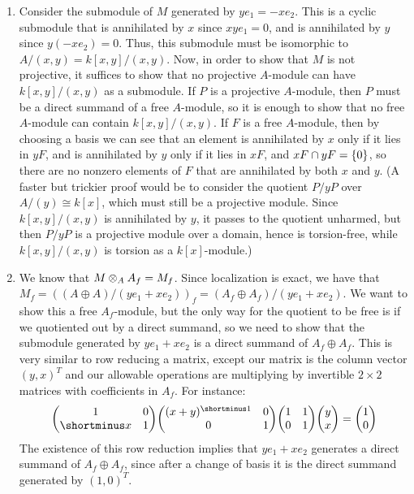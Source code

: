 \begin{solution}
\begin{enumerate}
    \item Consider the submodule of $M$ generated by $ye_1 = -xe_2$. This is a cyclic submodule that is annihilated by $x$ since $xye_1 = 0$, and is annihilated by $y$ since $y(-xe_2) = 0$. Thus, this submodule must be isomorphic to $A/(x,y) = k[x,y]/(x,y)$. Now, in order to show that $M$ is not projective, it suffices to show that no projective $A$-module can have $k[x,y]/(x,y)$ as a submodule. If $P$ is a projective $A$-module, then $P$ must be a direct summand of a free $A$-module, so it is enough to show that no free $A$-module can contain $k[x,y]/(x,y)$. If $F$ is a free $A$-module, then by choosing a basis we can see that an element is annihilated by $x$ only if it lies in $yF$, and is annihilated by $y$ only if it lies in $xF$, and $xF \cap yF = \{0\}$, so there are no nonzero elements of $F$ that are annihilated by both $x$ and $y$. (A faster but trickier proof would be to consider the quotient $P/yP$ over $A/(y) \cong k[x]$, which must still be a projective module. Since $k[x,y]/(x,y)$ is annihilated by $y$, it passes to the quotient unharmed, but then $P/yP$ is a projective module over a domain, hence is torsion-free, while $k[x,y]/(x,y)$ is torsion as a $k[x]$-module.)
    \item We know that $M \otimes_A A_f = M_f$. Since localization is exact, we have that $M_f = ((A \oplus A)/(ye_1+xe_2))_f = (A_f \oplus A_f)/(ye_1+xe_2)$. We want to show this a free $A_f$-module, but the only way for the quotient to be free is if we quotiented out by a direct summand, so we need to show that the submodule generated by $ye_1+xe_2$ is a direct summand of $A_f \oplus A_f$. This is very similar to row reducing a matrix, except our matrix is the column vector $(y,x)^T$ and our allowable operations are multiplying by invertible $2 \times 2$ matrices with coefficients in $A_f$. For instance:
    \[\twomatrix{1}{0}{\shortminus x}{1} \! \twomatrix{(x+y)\inv}{0}{0}{1} \! \twomatrix{1}{1}{0}{1} \! \begin{pmatrix} y \\ x \end{pmatrix} = \begin{pmatrix} 1 \\ 0 \end{pmatrix}\]
    The existence of this row reduction implies that $ye_1 + xe_2$ generates a direct summand of $A_f \oplus A_f$, since after a change of basis it is the direct summand generated by $(1,0)^T$.

\end{enumerate}
\end{solution}
